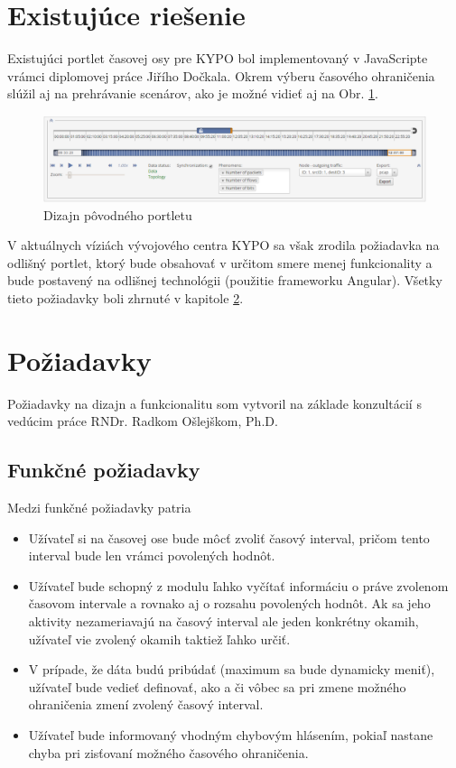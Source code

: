 \documentclass[
  digital, %
  twoside, %
  notable,   %
  nolof,   %
  nolot,   %
]{fithesis3}
\begin{document}
\section{Existujúce riešenie}
Existujúci portlet časovej osy pre KYPO bol implementovaný v JavaScripte vrámci diplomovej práce Jiřího Dočkala\cite{dockal2016webovy}. Okrem výberu časového ohraničenia slúžil aj na prehrávanie scenárov, ako je možné vidieť aj na Obr. \ref{old_portlet}.

\begin{figure}[H]
	\center
	\includegraphics[width=1.0\linewidth]{old_portlet}
	\caption{Dizajn pôvodného portletu\cite{dockal2016webovy}}
	\label{old_portlet}
\end{figure}

V aktuálnych víziách vývojového centra KYPO sa však zrodila požiadavka na odlišný portlet, ktorý bude obsahovať v určitom smere menej funkcionality a bude postavený na odlišnej technológii (použitie frameworku Angular). Všetky tieto požiadavky boli zhrnuté v kapitole \ref{requirements}.

\section{Požiadavky}
\label{requirements}
Požiadavky na dizajn a funkcionalitu som vytvoril na základe konzultácií s vedúcim práce RNDr. Radkom Ošlejškom, Ph.D.

\subsection{Funkčné požiadavky}
\label{funkcne_poziadavky}
Medzi funkčné požiadavky patria
\begin{itemize}
\item Užívateľ si na časovej ose bude môcť zvoliť časový interval, pričom tento interval bude len vrámci povolených hodnôt.
\item Užívateľ bude schopný z modulu ľahko vyčítať informáciu o práve zvolenom časovom intervale a rovnako aj o rozsahu povolených hodnôt. Ak sa jeho aktivity nezameriavajú na časový interval ale jeden konkrétny okamih, užívateľ vie zvolený okamih taktiež ľahko určiť.
\item V prípade, že dáta budú pribúdať (maximum sa bude dynamicky meniť), užívateľ bude vedieť definovať, ako a či vôbec sa pri zmene možného ohraničenia zmení zvolený časový interval.
\item Užívateľ bude informovaný vhodným chybovým hlásením, pokiaľ nastane chyba pri zisťovaní možného časového ohraničenia.
\end{itemize}
\end{document}

